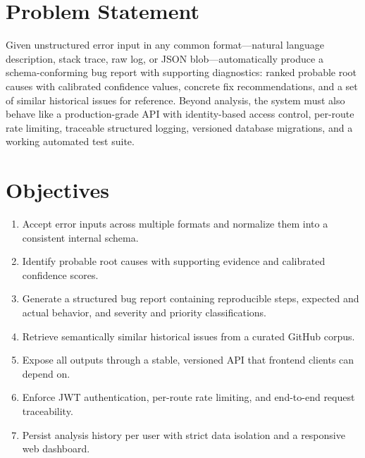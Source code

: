 \documentclass[12pt,a4paper]{article}
\begin{document}
\section{Problem Statement}

Given unstructured error input in any common format---natural language description, stack trace, raw log, or JSON blob---automatically produce a schema-conforming bug report with supporting diagnostics: ranked probable root causes with calibrated confidence values, concrete fix recommendations, and a set of similar historical issues for reference. Beyond analysis, the system must also behave like a production-grade API with identity-based access control, per-route rate limiting, traceable structured logging, versioned database migrations, and a working automated test suite.

\section{Objectives}

\begin{enumerate}[label=\textbf{\arabic*.}, leftmargin=*, itemsep=1pt, topsep=2pt]
  \item Accept error inputs across multiple formats and normalize them into a consistent internal schema.
  \item Identify probable root causes with supporting evidence and calibrated confidence scores.
  \item Generate a structured bug report containing reproducible steps, expected and actual behavior, and severity and priority classifications.
  \item Retrieve semantically similar historical issues from a curated GitHub corpus.
  \item Expose all outputs through a stable, versioned API that frontend clients can depend on.
  \item Enforce JWT authentication, per-route rate limiting, and end-to-end request traceability.
  \item Persist analysis history per user with strict data isolation and a responsive web dashboard.
\end{enumerate}

\end{document}
